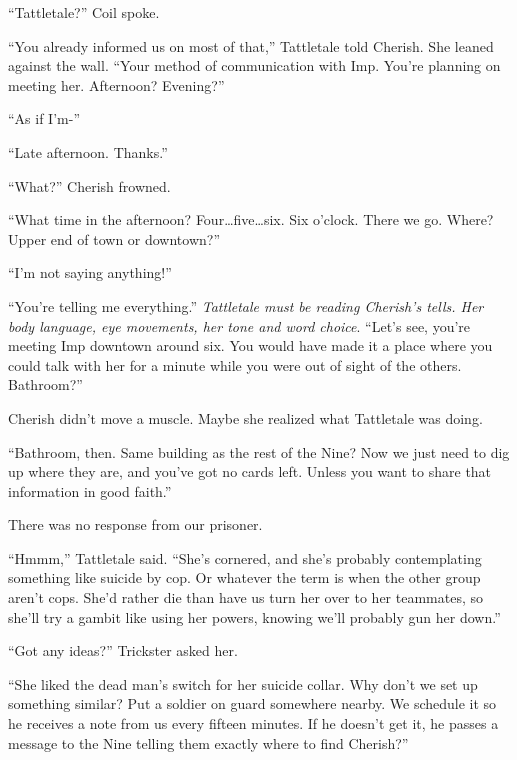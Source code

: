 ``Tattletale?'' Coil spoke.



``You already informed us on most of that,'' Tattletale told Cherish.  She leaned against the wall.  ``Your method of communication with Imp.  You're planning on meeting her.  Afternoon?  Evening?''



``As if I'm-''



``Late afternoon. Thanks.''



``What?''  Cherish frowned.



``What time in the afternoon?  Four\ldots five\ldots six.  Six o'clock.  There we go.  Where?  Upper end of town or downtown?''



``I'm not saying anything!''



``You're telling me everything.''  \emph{Tattletale must be reading Cherish's tells.  Her body language, eye movements, her tone and word choice}.  ``Let's see, you're meeting Imp downtown around six.  You would have made it a place where you could talk with her for a minute while you were out of sight of the others.  Bathroom?''



Cherish didn't move a muscle.  Maybe she realized what Tattletale was doing.



``Bathroom, then.  Same building as the rest of the Nine?  Now we just need to dig up where they are, and you've got no cards left.  Unless you want to share that information in good faith.''



There was no response from our prisoner.



``Hmmm,'' Tattletale said.  ``She's cornered, and she's probably contemplating something like suicide by cop.  Or whatever the term is when the other group aren't cops.  She'd rather die than have us turn her over to her teammates, so she'll try a gambit like using her powers, knowing we'll probably gun her down.''



``Got any ideas?'' Trickster asked her.



``She liked the dead man's switch for her suicide collar.  Why don't we set up something similar?  Put a soldier on guard somewhere nearby.  We schedule it so he receives a note  from us every fifteen minutes.  If he doesn't get it, he passes a message to the Nine telling them exactly where to find Cherish?''




